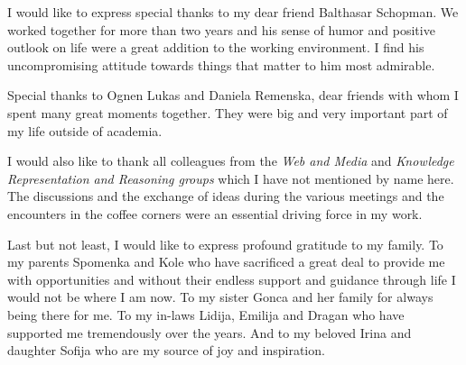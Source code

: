 I would like to express special thanks to my dear friend Balthasar Schopman. We worked together for more than two years and his sense of humor and positive outlook on life were a great addition to the working environment. I find his uncompromising attitude towards things that matter to him most admirable.

Special thanks to Ognen Lukas and Daniela Remenska, dear friends with whom I spent many great moments together. They were big	 and very important part of my life outside of academia.
 
I would also like to thank all colleagues from the \textit{Web and Media} and \textit{Knowledge Representation and Reasoning groups} which I have not mentioned by name here. The discussions and the exchange of ideas during the various meetings and the encounters in the coffee corners were an essential driving force in my work.

Last but not least, I would like to express profound gratitude to my family. To my parents Spomenka and Kole who have sacrificed a great deal to provide me with opportunities and without their endless support and guidance through life I would not be where I am now. To my sister Gonca and her family for always being there for me. To my in-laws Lidija, Emilija and Dragan who have supported me tremendously over the years. And to my beloved Irina and daughter Sofija who are my source of joy and inspiration.